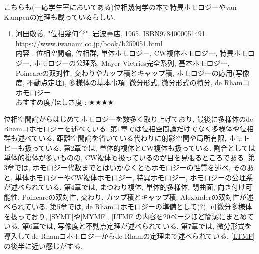 \documentclass[10pt,a4paper]{jsarticle}
\begin{document}
    こちらも(一応学生室においてある)位相幾何学の本で特異ホモロジーやvan Kampenの定理も載っているらしい. 
    \begin{enumerate}
        \renewcommand{\theenumi}{[TG\arabic{enumi}]}
        \renewcommand{\labelenumi}{\theenumi}
        \setcounter{enumi}{2}
        \item \label{KTTG} 河田敬義. "位相幾何学". 岩波書店. 1965. ISBN9784000051491. \\
        \url{https://www.iwanami.co.jp/book/b259051.html} \\
        内容 : 位相空間論, 位相群, 単体ホモロジー, CW複体ホモロジー, 特異ホモロジー, ホモロジーの公理系, Mayer-Vietries完全系列, 基本ホモロジー, Poincareの双対性, 交わりやカップ積とキャップ積, ホモロジーの応用(写像度, 不動点定理), 多様体の基本事項, 微分形式, 微分形式の積分, de Rhamコホモロジー\\
        おすすめ度/ほしさ度 : $\bigstar \bigstar \bigstar \bigstar $
    \end{enumerate}\par
    位相空間論からはじめてホモロジーを数多く取り上げており, 最後に多様体のde Rhamコホモロジーを述べている. 第1章では位相空間論だけでなく多様体や位相群も述べている. 距離空間論を省いている代わりに射影空間や局所有限, ホモトピーも扱っている. 第2章では, 単体的複体とCW複体も扱っている. 割合としては単体的複体が多いものの, CW複体も扱っているのが目を見張るところである. 第3章では, ホモロジー代数までとはいかなくともホモロジーの性質を述べ, そのあと, 単体ホモロジーやCW複体ホモロジー, 特異ホモロジー, ホモロジーの公理系が述べられている. 第4章では, まつわり複体, 単体的多様体, 閉曲面, 向き付け可能性, Poincareの双対性, 交わり, カップ積とキャップ積, Alexanderの双対性が述べられている. 第5章では, de Rhamコホモロジーの準備として(?), 可微分多様体を扱っており, \ref{SYMF}や\ref{MYMF}, \ref{LTMF}の内容を20ページほど簡潔にまとめている. 第6章では, 写像度と不動点定理が述べられている. 第7章では, 微分形式を導入してde Rhamコホモロジーからde Rhamの定理まで述べられている. \ref{LTMF}の後半に近い感じがする. 
\end{document}
